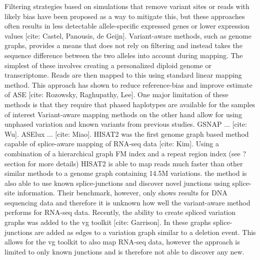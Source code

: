 Filtering strategies based on simulations that remove variant sites or reads with likely bias have been proposed as a way to mitigate this, but these approaches often results in less detectable allele-specific expressed genes or lower expression values [cite: Castel, Panousis, de Geijn].
Variant-aware methods, such as genome graphs, provides a means that does not rely on filtering and instead takes the sequence difference between the two alleles into account during mapping.
The simplest of these involves creating a personalized diploid genome or transcriptome.
Reads are then mapped to this using standard linear mapping method.
This approach has shown to reduce reference-bias and improve estimate of ASE [cite: Rozowsky, Raghupathy, Lee].
One major limitation of these methods is that they require that phased haplotypes are available for the samples of interest 
Variant-aware mapping methods on the other hand allow for using unphased variation and known variants from previous studies.
GSNAP ... [cite: Wu]. 
ASElux ... [cite: Miao].
HISAT2 was the first genome graph based method capable of splice-aware mapping of RNA-seq data [cite: Kim]. 
Using a combination of a hierarchical graph FM index and a repeat region index (see ? section for more details) HISAT2 is able to map reads much faster than other similar methods to a genome graph containing 14.5M variations. 
the method is also able to use known splice-junctions and discover novel junctions using splice-site information.
Their benchmark, however, only shows results for DNA sequencing data and therefore it is unknown how well the variant-aware method performs for RNA-seq data.
Recently, the ability to create spliced variation graphs was added to the vg toolkit [cite: Garrison]. 
In these graphs splice-junctions are added as edges to a variation graph similar to a deletion event. 
This allows for the vg toolkit to also map RNA-seq data, however the approach is limited to only known junctions and is therefore not able to discover any new.

